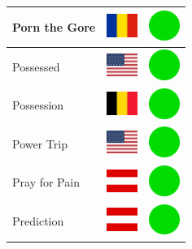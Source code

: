 \documentclass[12pt, a4paper, twoside]{report}
\begin{document}
\begin{center}
\begin{longtable}{|p{5cm}|p{2cm}|p{2cm}|}
 Porn the Gore                                              & \includegraphics[width=1cm]{../4x3/ro} &   \includegraphics[width=1cm]{../likes/y} \\ \hline
 Possessed                                                  & \includegraphics[width=1cm]{../4x3/us} &   \includegraphics[width=1cm]{../likes/y} \\ \hline
 Possession                                                 & \includegraphics[width=1cm]{../4x3/be} &   \includegraphics[width=1cm]{../likes/y} \\ \hline
 Power Trip                                                 & \includegraphics[width=1cm]{../4x3/us} &   \includegraphics[width=1cm]{../likes/y} \\ \hline
 Pray for Pain                                              & \includegraphics[width=1cm]{../4x3/at} &   \includegraphics[width=1cm]{../likes/y} \\ \hline
 Prediction                                                 & \includegraphics[width=1cm]{../4x3/at} &   \includegraphics[width=1cm]{../likes/y} \\ \hline

\end{longtable}
\end{center}
\end{document}
